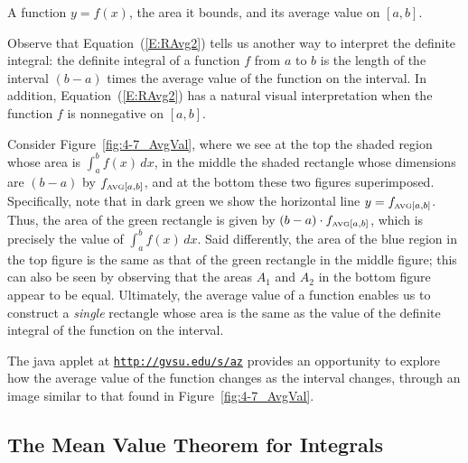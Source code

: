 \begin{marginfigure} %
\captionsetup[subfigure]{labelformat=empty}


\caption{A function $y = f(x)$, the area it bounds, and its average value on $[a,b]$.} \label{fig:4-7_AvgVal}
\end{marginfigure}

Observe that Equation~(\ref{E:RAvg2}) tells us another way to interpret the definite integral:  the definite integral of a function $f$ from $a$ to $b$ is the length of the interval $(b-a)$ times the average value of the function on the interval.  In addition, Equation~(\ref{E:RAvg2}) has a natural visual interpretation when the function $f$ is nonnegative on $[a,b]$.  

Consider Figure~\ref{fig:4-7_AvgVal}, where we see at the top the shaded region whose area is $\int_a^b f(x) \, dx$, in the middle the shaded rectangle whose dimensions are $(b-a)$ by $f_{\mbox{\tiny{AVG}}[a,b]}$, and at the bottom these two figures superimposed.  Specifically, note that in dark green we show the horizontal line $y = f_{\mbox{\tiny{AVG}}[a,b]}$.  Thus, the area of the green rectangle is given by $(b-a) \cdot f_{\mbox{\tiny{AVG}}[a,b]}$, which is precisely the value of $\int_a^b f(x) \, dx$.  Said differently, the area of the blue region in the top figure is the same as that of the green rectangle in the middle figure; this can also be seen by observing that the areas $A_1$ and $A_2$ in the bottom figure appear to be equal.  Ultimately, the average value of a function enables us to construct a {\em single} rectangle whose area is the same as the value of the definite integral of the function on the interval.  

The java applet at \href{http://gvsu.edu/s/az}{\texttt{http://gvsu.edu/s/az}} provides an opportunity to explore how the average value of the function changes as the interval changes, through an image similar to that found in Figure~\ref{fig:4-7_AvgVal}.


\subsection*{The Mean Value Theorem for Integrals}

